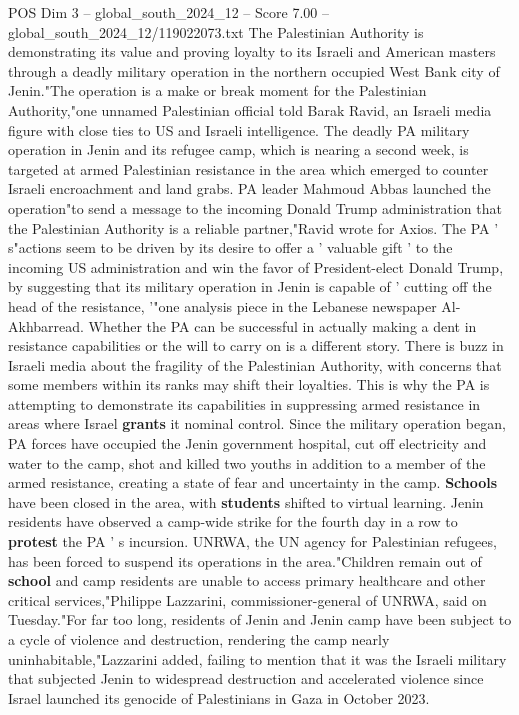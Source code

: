 \begin{textsample}{POS Dim 3 – global\_south\_2024\_12 – Score 7.00 – global\_south\_2024\_12/119022073.txt}  \label{ex:f3_pos_390}
The Palestinian Authority is demonstrating its value and proving loyalty to its Israeli and American masters through a deadly military operation in the northern occupied West Bank city of Jenin."The operation is a make or break moment for the Palestinian Authority,"one unnamed Palestinian official told Barak Ravid, an Israeli media figure with close ties to US and Israeli intelligence.
The deadly PA military operation in Jenin and its refugee camp, which is nearing a second week, is targeted at armed Palestinian resistance in the area which emerged to counter Israeli encroachment and land grabs.
PA leader Mahmoud Abbas launched the operation"to send a message to the incoming Donald Trump administration that the Palestinian Authority is a reliable partner,"Ravid wrote for Axios.
The PA ' s"actions seem to be driven by its desire to offer a ' valuable gift ' to the incoming US administration and win the favor of President-elect Donald Trump, by suggesting that its military operation in Jenin is capable of ' cutting off the head of the resistance, '"one analysis piece in the Lebanese newspaper Al-Akhbarread.
Whether the PA can be successful in actually making a dent in resistance capabilities or the will to carry on is a different story.
There is buzz in Israeli media about the fragility of the Palestinian Authority, with concerns that some members within its ranks may shift their loyalties.
This is why the PA is attempting to demonstrate its capabilities in suppressing armed resistance in areas where Israel \textbf{grants} it nominal control.
Since the military operation began, PA forces have occupied the Jenin government hospital, cut off electricity and water to the camp, shot and killed two youths in addition to a member of the armed resistance, creating a state of fear and uncertainty in the camp. \textbf{Schools} have been closed in the area, with \textbf{students} shifted to virtual learning.
Jenin residents have observed a camp-wide strike for the fourth day in a row to \textbf{protest} the PA ' s incursion.
UNRWA, the UN agency for Palestinian refugees, has been forced to suspend its operations in the area."Children remain out of \textbf{school} and camp residents are unable to access primary healthcare and other critical services,"Philippe Lazzarini, commissioner-general of UNRWA, said on Tuesday."For far too long, residents of Jenin and Jenin camp have been subject to a cycle of violence and destruction, rendering the camp nearly uninhabitable,"Lazzarini added, failing to mention that it was the Israeli military that subjected Jenin to widespread destruction and accelerated violence since Israel launched its genocide of Palestinians in Gaza in October 2023.

\end{textsample}
